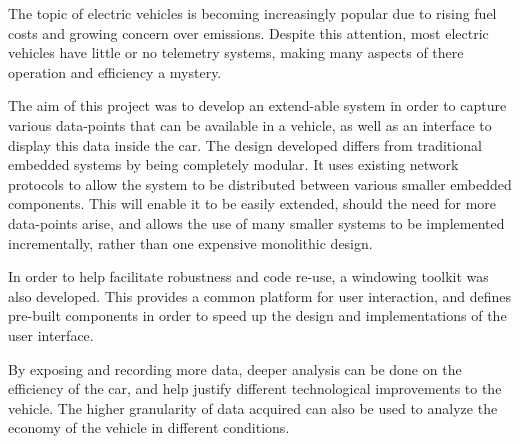 


\begin{abstracts}        %

The topic of electric vehicles is becoming increasingly popular due to rising fuel costs and growing concern over emissions. Despite this attention, most electric vehicles have little or no telemetry systems, making many aspects of there operation and efficiency a mystery. 

The aim of this project was to develop an extend-able system in order to capture various data-points that can be available in a vehicle, as well as an interface to display this data inside the car. The design developed differs from traditional embedded systems by being completely modular. It uses existing network protocols to allow the system to be distributed between various smaller embedded components. This will enable it to be easily extended, should the need for more data-points arise, and allows the use of many smaller systems to be implemented incrementally, rather than one expensive monolithic design.

In order to help facilitate robustness and code re-use, a windowing toolkit was also developed. This provides a common platform for user interaction, and defines pre-built components in order to speed up the design and implementations of the user interface.

By exposing and recording more data, deeper analysis can be done on the efficiency of the car, and help justify different technological improvements to the vehicle. The higher granularity of data acquired can also be used to analyze the economy of the vehicle in different conditions.

\end{abstracts}


